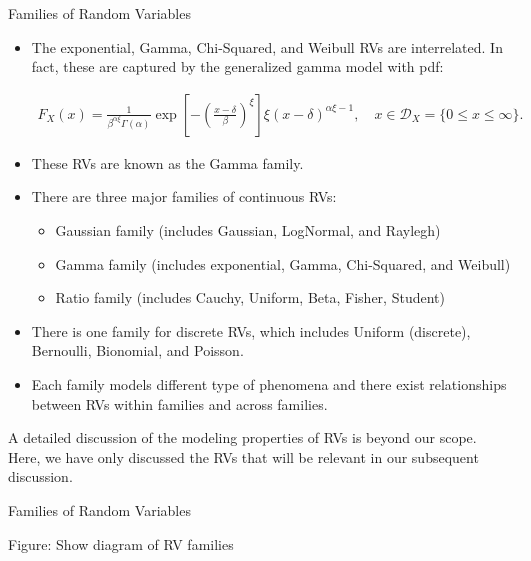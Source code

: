 \documentclass[9pt]{beamer}
\begin{document}
%
\begin{frame}{Families of Random Variables}
\begin{itemize}

\item The exponential, Gamma, Chi-Squared, and Weibull RVs are interrelated. In fact, these are captured by the generalized gamma model with pdf:
\begin{block}{}
\begin{align*}
F_X(x)=\frac{1}{\beta^{\alpha\xi}\Gamma(\alpha)}\exp\left[-\left(\frac{x-\delta}{\beta}\right)^\xi\right]\xi(x-\delta)^{\alpha\xi-1},\quad x\in \mathcal{D}_X=\{0\leq x\leq \infty\}.
\end{align*}
\end{block}
\item These RVs are known as the Gamma family. 
\item There are three major families of continuous RVs: 
\begin{itemize}
\item Gaussian family (includes Gaussian, LogNormal, and Raylegh)
\item Gamma family (includes exponential, Gamma, Chi-Squared, and Weibull)
\item Ratio family (includes Cauchy, Uniform, Beta, Fisher, Student)
\end{itemize}

\item There is one family for discrete RVs, which includes Uniform (discrete), Bernoulli, Bionomial, and Poisson.

\item Each family models different type of phenomena and there exist relationships between RVs within families and across families. 

\end{itemize}
A detailed discussion of the modeling properties of RVs is beyond our scope. Here, we have only discussed the RVs that will be relevant in our subsequent discussion. 

\end{frame}

%
\begin{frame}{Families of Random Variables}

\begin{block}{}
{\color{red} Figure: Show diagram of RV families}
\end{block}

\end{frame}
\end{document}
